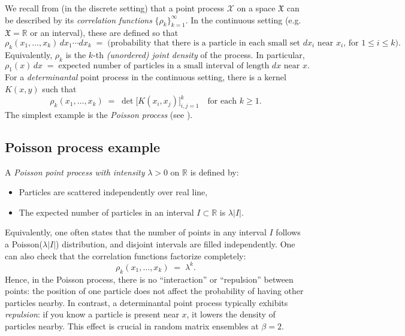 \documentclass[letterpaper,11pt,oneside,reqno]{article}
\numberwithin{equation}{section}
\theoremstyle{definition}
\begin{document}
We recall from  (in the discrete setting) that a point process \(\mathcal{X}\) on a space \(\mathfrak{X}\) can be described by its \emph{correlation functions} \(\{\rho_k\}_{k=1}^\infty\). In the continuous setting (e.g.\ \(\mathfrak{X}=\mathbb{R}\) or an interval), these are defined so that
\begin{equation}
  \rho_k(x_1,\dots,x_k)\,dx_1\cdots dx_k
  \;=\;
  \text{(probability that there is a particle in each small set $dx_i$ near $x_i$, for $1\le i\le k$)}.
\end{equation}
Equivalently, \(\rho_k\) is the \(k\)-th \emph{(unordered) joint density} of the process.  In particular,
\[
  \rho_1(x)\,dx
  \;=\;
  \text{expected number of particles in a small interval of length $dx$ near $x$.}
\]
For a \emph{determinantal} point process in the continuous setting, there is a kernel \(K(x,y)\) such that
\begin{equation}
  \label{eq:rho-k-dpp-cont}
  \rho_k(x_1,\dots,x_k)
  \;=\;
  \det\bigl[K(x_i,x_j)\bigr]_{i,j=1}^k
  \quad
  \text{for each $k\ge1$}.
\end{equation}
The simplest example is the \emph{Poisson process} (see ).

\subsection{Poisson process example}
\label{subsec:poisson-example}

A \emph{Poisson point process with intensity} \(\lambda>0\) on \(\mathbb{R}\) is defined by:
\begin{itemize}
	\item Particles are scattered independently over real line,
	\item The expected number of particles in an interval \(I\subset \mathbb{R}\) is \(\lambda|I|\).
\end{itemize}
Equivalently, one often states that the number of points in any interval \(I\) follows a Poisson(\(\lambda|I|\)) distribution, and disjoint intervals are filled independently.  One can also check that the correlation functions factorize completely:
\[
\rho_k(x_1,\dots,x_k) \;=\; \lambda^k.
\]
Hence, in the Poisson process, there is no ``interaction'' or ``repulsion'' between points: the position of one particle does not affect the probability of having other particles nearby.  In contrast, a determinantal point process typically exhibits \emph{repulsion}: if you know a particle is present near \(x\), it lowers the density of particles nearby.  This effect is crucial in random matrix ensembles at \(\beta=2\).
\end{document}
